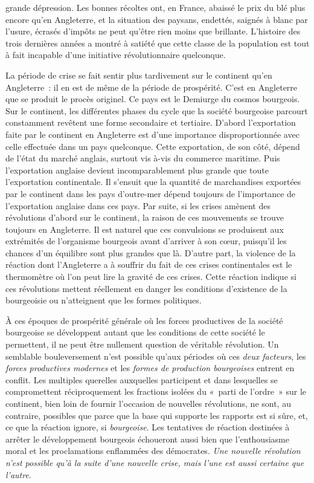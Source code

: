 \documentclass[french,twoside]{book} %
\begin{document}
grande dépression. Les bonnes récoltes ont, en France, abaissé le prix du blé plus encore qu’en Angleterre, et la situation des paysans, endettés, saignés à blanc par l’usure, écrasés d’impôts ne peut qu’être rien moins que brillante. L’histoire des trois dernières années a montré à satiété que cette classe de la population est tout à fait incapable d’une initiative révolutionnaire quelconque.\par
La période de crise se fait sentir plus tardivement sur le continent qu’en Angleterre : il en est de même de la période de prospérité. C’est en Angleterre que se produit le procès originel. Ce pays est le Demiurge du cosmos bourgeois. Sur le continent, les différentes phases du cycle que la société bourgeoise parcourt constamment revêtent une forme secondaire et tertiaire. D’abord l’exportation faite par le continent en Angleterre est d’une importance disproportionnée avec celle effectuée dans un pays quelconque. Cette exportation, de son côté, dépend de l’état du marché anglais, surtout vis à-vis du commerce maritime. Puis l’exportation anglaise devient incomparablement plus grande que toute l’exportation continentale. Il s’ensuit que la quantité de marchandises exportées par le continent dans les pays d’outre-mer dépend toujours de l’importance de l’exportation anglaise dans ces pays. Par suite, si les crises amènent des révolutions d’abord sur le continent, la raison de ces mouvements se trouve toujours en Angleterre. Il est naturel que ces convulsions se produisent aux extrémités de l’organisme bourgeois avant d’arriver à son cœur, puisqu’il les chances d’un équilibre sont plus grandes que là. D’autre part, la violence de la réaction dont l’Angleterre a à souffrir du fait de ces crises continentales est le thermomètre où l’on peut lire la gravité de ces crises. Cette réaction indique si ces révolutions mettent réellement en danger les conditions d’existence de la bourgeoisie ou n’atteignent que les formes politiques.\par
À ces époques de prospérité générale où les forces productives de la société bourgeoise se développent autant que les conditions de cette société le permettent, il ne peut être nullement question de véritable révolution. Un semblable bouleversement n’est possible qu’aux périodes où ces \emph{deux facteurs}, les \emph{forces productives modernes} et les \emph{formes de production bourgeoises} entrent en conflit. Les multiples querelles auxquelles participent et dans lesquelles se compromettent réciproquement les fractions isolées du « parti de l’ordre » sur le continent, bien loin de fournir l’occasion de nouvelles révolutions, ne sont, au contraire, possibles que parce que la base qui supporte les rapports est si sûre, et, ce que la réaction ignore, si \emph{bourgeoise}. Les tentatives de réaction destinées à arrêter le développement bourgeois échoueront aussi bien que l’enthousiasme moral et les proclamations enflammées des démocrates. \emph{Une nouvelle révolution n’est possible qu’à la suite d’une nouvelle crise, mais l’une est aussi certaine que l’autre}.\par
\end{document}
